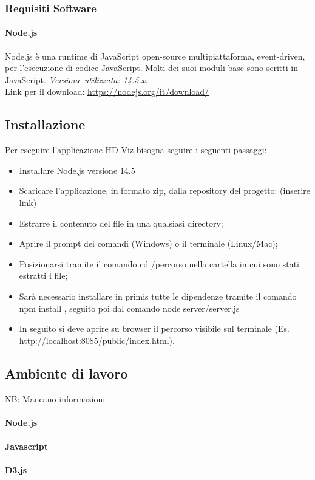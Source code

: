 \documentclass[../manuale_sviluppatore.tex]{subfiles}
\begin{document}
\subsubsection{Requisiti Software}
    \label{subsub:req_s}
\paragraph{Node.js}
    \label{par:node}
Node.js è una runtime di JavaScript open-source multipiattaforma, event-driven, per l’esecuzione di codice JavaScript. Molti dei suoi moduli base sono scritti in JavaScript. 
\emph{Versione utilizzata: 14.5.x}.\\
Link per il download: \url{https://nodejs.org/it/download/}

\subsection{Installazione}
    \label{sub:inst}

Per eseguire l’applicazione HD-Viz bisogna seguire i seguenti passaggi:
\begin{itemize}
\item Installare Node.js versione 14.5
\item Scaricare l’applicazione, in formato zip, dalla repository del progetto: (inserire link)
\item Estrarre il contenuto del file in una qualsiasi directory; 
\item Aprire il prompt dei comandi (Windows) o il terminale (Linux/Mac); 
\item Posizionarsi tramite il comando cd /percorso nella cartella in cui sono stati estratti i file;
\item Sarà necessario installare in primis tutte le dipendenze tramite il comando npm install , seguito poi dal comando node server/server.js
\item In seguito si deve aprire su browser il percorso visibile sul terminale (Es. \url{http://localhost:8085/public/index.html}).
\end{itemize}


\subsection{Ambiente di lavoro}
NB: Mancano informazioni

\paragraph{Node.js}

\paragraph{Javascript}

\paragraph{D3.js}
\end{document}
